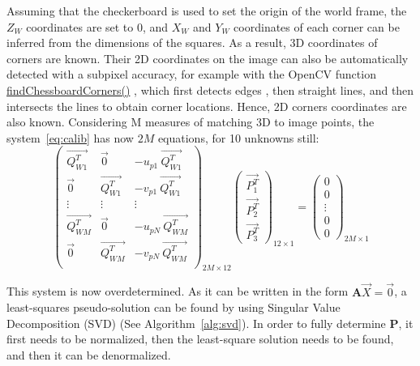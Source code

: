 Assuming that the checkerboard is used to set the origin of the world frame, the $Z_W$ coordinates are set to 0, and $X_W$ and $Y_W$ coordinates of each corner can be inferred from the dimensions of the squares. As a result, 3D coordinates of corners are known. Their 2D coordinates on the image can also be automatically detected with a subpixel accuracy, for example with the OpenCV function \href{https://docs.opencv.org/4.x/d9/d0c/group__calib3d.html#ga93efa9b0aa890de240ca32b11253dd4a}{findChessboardCorners()} \cite{Bradski2000}, which first detects edges \cite{Canny1986}, then straight lines, and then intersects the lines to obtain corner locations. Hence, 2D corners coordinates are also known. Considering M measures of matching 3D to image points, the system~\ref{eq:calib} has now $2M$ equations, for 10 unknowns still:
\begin{equation}
  \begin{pmatrix}
    \overrightarrow{Q_{W1}^T} & \overrightarrow{0} & - u_{p1} \ \overrightarrow{Q_{W1}^T}\\   
    \overrightarrow{0} & \overrightarrow{Q_{W1}^T} & - v_{p1} \ \overrightarrow{Q_{W1}^T} \\ 
    \vdots & \vdots & \vdots\\
    \overrightarrow{Q_{WM}^T} & \overrightarrow{0} & - u_{pN} \ \overrightarrow{Q_{WM}^T}\\   
    \overrightarrow{0} & \overrightarrow{Q_{WM}^T} & - v_{pN} \ \overrightarrow{Q_{WM}^T} \\ 
  \end{pmatrix}_{\!\!2M\times 12}
  \begin{pmatrix} \overrightarrow{P_1^T} \\ \overrightarrow{P_2^T} \\ \overrightarrow{P_3^T} \end{pmatrix}_{\!\!12\times 1}
  = \begin{pmatrix} 0 \\ 0 \\ \vdots \\ 0 \\ 0 \end{pmatrix}_{\!\!2M\times 1}
\end{equation}

This system is now overdetermined. As it can be written in the form \(\textbf{A} \overrightarrow{X} = \overrightarrow{0}\), a least-squares pseudo-solution can be found \cite{Hartley2003} by using Singular Value Decomposition (SVD) \cite{Golub1971} (See Algorithm~\ref{alg:svd}). In order to fully determine $\textbf{P}$, it first needs to be normalized, then the least-square solution needs to be found, and then it can be denormalized. 

